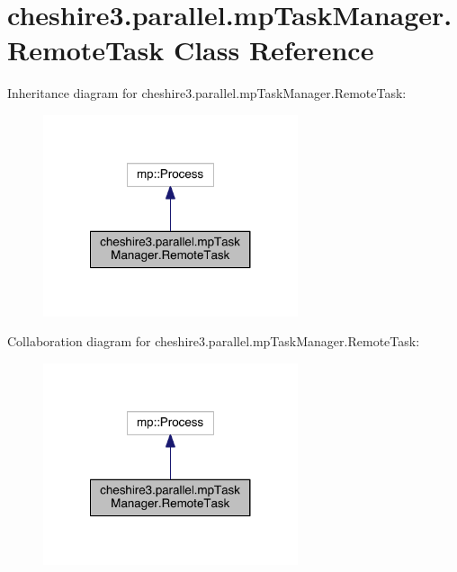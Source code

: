 \hypertarget{classcheshire3_1_1parallel_1_1mp_task_manager_1_1_remote_task}{\section{cheshire3.\-parallel.\-mp\-Task\-Manager.\-Remote\-Task Class Reference}
\label{classcheshire3_1_1parallel_1_1mp_task_manager_1_1_remote_task}
}


Inheritance diagram for cheshire3.\-parallel.\-mp\-Task\-Manager.\-Remote\-Task\-:
\nopagebreak
\begin{figure}[H]
\begin{center}
\leavevmode
\includegraphics[width=212pt]{classcheshire3_1_1parallel_1_1mp_task_manager_1_1_remote_task__inherit__graph}
\end{center}
\end{figure}


Collaboration diagram for cheshire3.\-parallel.\-mp\-Task\-Manager.\-Remote\-Task\-:
\nopagebreak
\begin{figure}[H]
\begin{center}
\leavevmode
\includegraphics[width=212pt]{classcheshire3_1_1parallel_1_1mp_task_manager_1_1_remote_task__coll__graph}
\end{center}
\end{figure}
